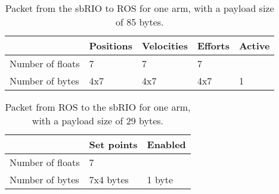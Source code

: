 \begin{table}[H]
\centering
\begin{tabular}{| l | l | l | l | l |}
  \hline			
  				 & Positions & Velocities & Efforts & Active\\ \hline
Number of floats & 7 		 & 7 		  & 7 		& 		\\ \hline
Number of bytes  & 4x7 		 & 4x7 		  & 4x7 	& 1		\\
\hline  
\end{tabular}
\caption{Packet from the sbRIO to ROS for one arm, with a payload size of 85 bytes.}
\label{fig:received_packet}
\end{table}

\begin{table}[H]
\centering
\begin{tabular}{| l | l | l |}
\hline			
					& Set points	 & Enabled\\ \hline
Number of floats	& 7				 &		  \\ \hline
Number of bytes		& 7x4 bytes		 & 1 byte \\
\hline  
\end{tabular}
\caption{Packet from ROS to the sbRIO for one arm, with a payload size of 29 bytes.}
\label{fig:sent_packet}
\end{table}









